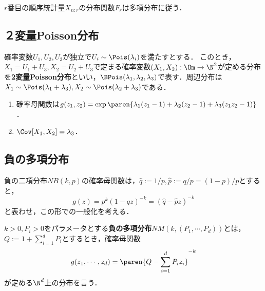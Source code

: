 \documentclass[uplatex,dvipdfmx]{jsreport}
\begin{document}
\begin{proposition}[順序統計量]
    $r$番目の順序統計量$X_{n:r}$の分布関数$F_r$は多項分布に従う．
\end{proposition}

\subsection{２変量Poisson分布}

\begin{definition}
    確率変数$U_1,U_2,U_3$が独立で$U_i\sim\Pois(\lambda_i)$を満たすとする．
    このとき，$X_1=U_1+U_3,X_2=U_2+U_3$で定まる確率変数$(X_1,X_2):\Om\to\N^2$が定める分布を\textbf{2変量Poisson分布}といい，$\BPois(\lambda_1,\lambda_2,\lambda_3)$で表す．周辺分布は$X_1\sim\Pois(\lambda_1+\lambda_3),X_2\sim\Pois(\lambda_2+\lambda_3)$である．
\end{definition}

\begin{proposition}[分散や混合積率は確率母関数の項別微分で求める]\mbox{}
    \begin{enumerate}
        \item 確率母関数は$g(z_1,z_2)=\exp\paren{\lambda_1(z_1-1)+\lambda_2(z_2-1)+\lambda_3(z_1z_2-1)}$．
        \item $\Cov[X_1,X_2]=\lambda_3$．
    \end{enumerate}
\end{proposition}

\subsection{負の多項分布}

\begin{tcolorbox}[colframe=ForestGreen, colback=ForestGreen!10!white,breakable,colbacktitle=ForestGreen!40!white,coltitle=black,fonttitle=\bfseries\sffamily,
title=]
    負の二項分布$NB(k,p)$の確率母関数は，$\hat{q}:=1/p,\hat{p}:=q/p=(1-p)/p$とすると，
    \[g(z)=p^k(1-qz)^{-k}=(\hat{q}-\hat{p}z)^{-k}\]
    と表わせ，この形での一般化を考える．
\end{tcolorbox}

\begin{definition}
    $k>0,P_i>0$をパラメータとする\textbf{負の多項分布}$NM(k,(P_1,\cdots,P_d))$とは，$Q:=1+\sum^d_{i=1}P_i$とするとき，確率母関数
    \[g(z_1,\cdots,z_d)=\paren{Q-\sum^d_{i=1}P_iz_i}^{-k}\]
    が定める$\N^d$上の分布を言う．
\end{definition}
\end{document}
